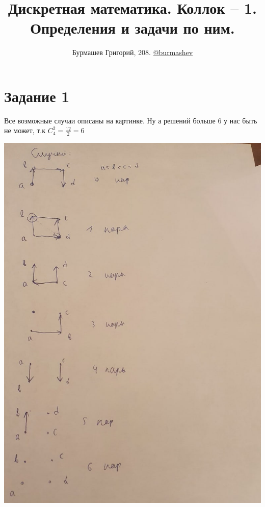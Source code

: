 \documentclass[a4paper,12pt]{article}
\author{Бурмашев Григорий, 208. \href{https://teleg.run/burmashev}{@burmashev}}
\title{Дискретная математика. Коллок -- 1. Определения и задачи по ним.}
\date{}
\begin{document}
\section*{Задание 1}
Все возможные случаи описаны на картинке. Ну а решений больше 6 у нас быть не может, т.к $C_4^2 = \frac{12}{2} = 6$
\begin{center}
\includegraphics[scale=0.4]{1Gxl2kd-6LU.jpg}
\end{center}
\newpage
\end{document}
